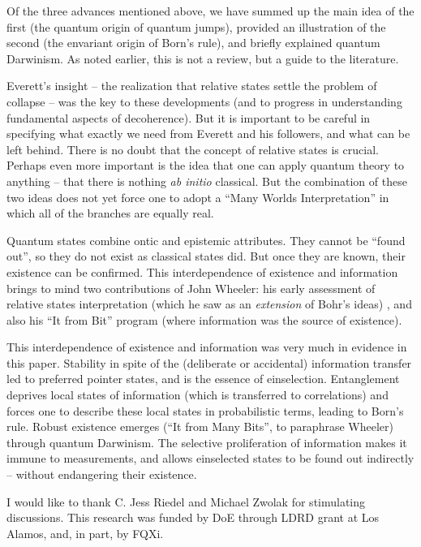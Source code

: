 \documentclass[aps,amsmath,amssymb,amsfonts,floatfix]{revtex4-1}
\newcommand{\+}         {\dagger}
\begin{document}
{{{Of the three advances mentioned above, we have summed up the main idea of the first (the quantum origin
of quantum jumps), provided an illustration of the second (the envariant origin of Born's rule), and briefly
explained quantum Darwinism. As noted earlier, this is not
a review, but a guide to the literature.

Everett's insight -- the realization that relative states settle the problem of collapse -- was the key to these
developments (and to progress in understanding fundamental aspects of decoherence). But it is important to
be careful in specifying what exactly we need from Everett and his followers, and what can
be left behind. There is no doubt that the concept of relative states is crucial. Perhaps even more
important is the idea that one can apply quantum theory to anything -- that there is nothing {\it ab initio}
classical. But the combination of these two ideas does not yet force one to adopt a
``Many Worlds Interpretation'' in which all of the branches are equally real.

Quantum states combine ontic and epistemic attributes. They cannot be ``found out'', so they do not
exist as classical states did. But once they are known, their existence can be confirmed.
This interdependence of existence and information brings to mind two contributions of
John Wheeler:  his early assessment of relative states interpretation (which he saw as
an {\it extension} of Bohr's ideas) \cite{JAW}, and also his ``It from Bit'' program \cite{63} (where information was
the source of existence).

This interdependence of existence and information was very much in evidence in this paper.  Stability
in spite of the (deliberate or accidental) information transfer led to preferred pointer states, and is the
essence of einselection. Entanglement deprives local states of information (which is transferred
to correlations) and forces one to describe these local states in probabilistic terms, leading to Born's
rule. Robust existence emerges (``It from Many Bits'', to paraphrase Wheeler) through quantum Darwinism.  The selective proliferation
of information makes it immune to measurements, and allows einselected states to be
found out indirectly -- without endangering their existence.

I would like to thank C. Jess Riedel and
Michael Zwolak for stimulating discussions. This research was
funded by DoE through LDRD grant at Los Alamos, and, in part, by FQXi.

}}}
\end{document}
